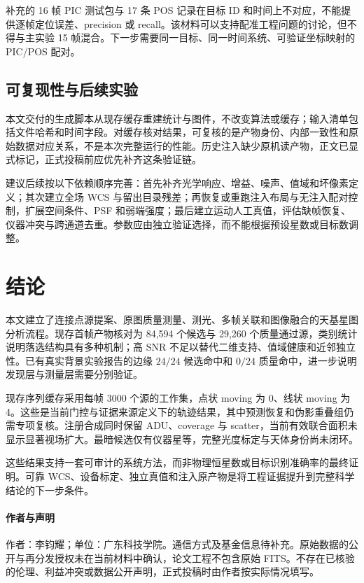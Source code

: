 \documentclass[UTF8,a4paper,11pt,fontset=windows]{ctexart}
\begin{document}
补充的 16 帧 PIC 测试包与 17 条 POS 记录在目标 ID 和时间上不对应，不能提供逐帧定位误差、precision 或 recall。该材料可以支持配准工程问题的讨论，但不得与主实验 15 帧混合。下一步需要同一目标、同一时间系统、可验证坐标映射的 PIC/POS 配对。

\subsection{可复现性与后续实验}
本文交付的生成脚本从现存缓存重建统计与图件，不改变算法或缓存；输入清单包括文件哈希和时间字段。对缓存核对结果，可复核的是产物身份、内部一致性和原始数据对应关系，不是本次完整运行的性能。历史注入缺少原机读产物，正文已显式标记，正式投稿前应优先补齐这条验证链。

建议后续按以下依赖顺序完善：首先补齐光学响应、增益、噪声、值域和坏像素定义；其次建立全场 WCS 与留出目录残差；再恢复或重跑注入布局与无注入配对控制，扩展空间条件、PSF 和弱端强度；最后建立运动人工真值，评估缺帧恢复、仪器冲突与跨通道去重。参数应由独立验证选择，而不能根据预设星数或目标数调整。

\section{结论}
本文建立了连接点源提案、原图质量测量、测光、多帧关联和图像融合的天基星图分析流程。现存首帧产物核对为 84,594 个候选与 29,260 个质量通过源，类别统计说明落选结构具有多种机制；高 SNR 不足以替代二维支持、值域健康和近邻独立性。已有真实背景实验报告的边缘 $24/24$ 候选命中和 $0/24$ 质量命中，进一步说明发现层与测量层需要分别验证。

现存序列缓存采用每帧 3000 个源的工作集，点状 moving 为 0、线状 moving 为 4。这些是当前门控与证据来源定义下的轨迹结果，其中预测恢复和伪影重叠组仍需专项复核。注册合成同时保留 ADU、coverage 与 scatter，当前有效联合面积未显示显著视场扩大。最暗候选仅有仪器星等，完整光度标定与天体身份尚未闭环。

这些结果支持一套可审计的系统方法，而非物理恒星数或目标识别准确率的最终证明。可靠 WCS、设备标定、独立真值和注入原产物是将工程证据提升到完整科学结论的下一步条件。

\paragraph{作者与声明} 作者：李钧耀；单位：广东科技学院。通信方式及基金信息待补充。原始数据的公开与再分发授权未在当前材料中确认，论文工程不包含原始 FITS。不存在已核验的伦理、利益冲突或数据公开声明，正式投稿时由作者按实际情况填写。
\end{document}

